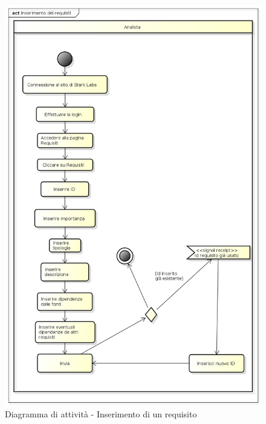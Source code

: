 \begin{figure}[htbp]
\centering
\includegraphics[scale=0.5]{immagini/inserimento_requisiti.png}
\captionsetup{labelfont=bf}
\caption{Diagramma di attività - Inserimento di un requisito}\label{sec:Figura2}
\end{figure}

\newpage
